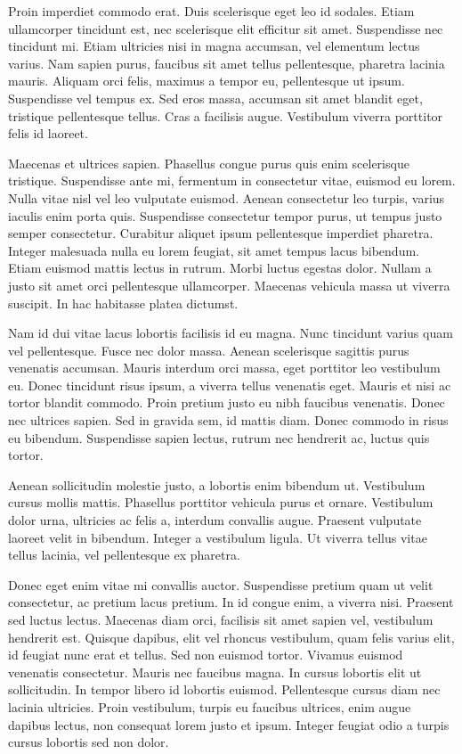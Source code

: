 \documentclass{article}
\begin{document}
Proin imperdiet commodo erat. Duis scelerisque eget leo id sodales. Etiam ullamcorper tincidunt est, nec scelerisque elit efficitur sit amet. Suspendisse nec tincidunt mi. Etiam ultricies nisi in magna accumsan, vel elementum lectus varius. Nam sapien purus, faucibus sit amet tellus pellentesque, pharetra lacinia mauris. Aliquam orci felis, maximus a tempor eu, pellentesque ut ipsum. Suspendisse vel tempus ex. Sed eros massa, accumsan sit amet blandit eget, tristique pellentesque tellus. Cras a facilisis augue. Vestibulum viverra porttitor felis id laoreet.

Maecenas et ultrices sapien. Phasellus congue purus quis enim scelerisque tristique. Suspendisse ante mi, fermentum in consectetur vitae, euismod eu lorem. Nulla vitae nisl vel leo vulputate euismod. Aenean consectetur leo turpis, varius iaculis enim porta quis. Suspendisse consectetur tempor purus, ut tempus justo semper consectetur. Curabitur aliquet ipsum pellentesque imperdiet pharetra. Integer malesuada nulla eu lorem feugiat, sit amet tempus lacus bibendum. Etiam euismod mattis lectus in rutrum. Morbi luctus egestas dolor. Nullam a justo sit amet orci pellentesque ullamcorper. Maecenas vehicula massa ut viverra suscipit. In hac habitasse platea dictumst.

Nam id dui vitae lacus lobortis facilisis id eu magna. Nunc tincidunt varius quam vel pellentesque. Fusce nec dolor massa. Aenean scelerisque sagittis purus venenatis accumsan. Mauris interdum orci massa, eget porttitor leo vestibulum eu. Donec tincidunt risus ipsum, a viverra tellus venenatis eget. Mauris et nisi ac tortor blandit commodo. Proin pretium justo eu nibh faucibus venenatis. Donec nec ultrices sapien. Sed in gravida sem, id mattis diam. Donec commodo in risus eu bibendum. Suspendisse sapien lectus, rutrum nec hendrerit ac, luctus quis tortor.

Aenean sollicitudin molestie justo, a lobortis enim bibendum ut. Vestibulum cursus mollis mattis. Phasellus porttitor vehicula purus et ornare. Vestibulum dolor urna, ultricies ac felis a, interdum convallis augue. Praesent vulputate laoreet velit in bibendum. Integer a vestibulum ligula. Ut viverra tellus vitae tellus lacinia, vel pellentesque ex pharetra.

Donec eget enim vitae mi convallis auctor. Suspendisse pretium quam ut velit consectetur, ac pretium lacus pretium. In id congue enim, a viverra nisi. Praesent sed luctus lectus. Maecenas diam orci, facilisis sit amet sapien vel, vestibulum hendrerit est. Quisque dapibus, elit vel rhoncus vestibulum, quam felis varius elit, id feugiat nunc erat et tellus. Sed non euismod tortor. Vivamus euismod venenatis consectetur. Mauris nec faucibus magna. In cursus lobortis elit ut sollicitudin. In tempor libero id lobortis euismod. Pellentesque cursus diam nec lacinia ultricies. Proin vestibulum, turpis eu faucibus ultrices, enim augue dapibus lectus, non consequat lorem justo et ipsum. Integer feugiat odio a turpis cursus lobortis sed non dolor.
\end{document}

